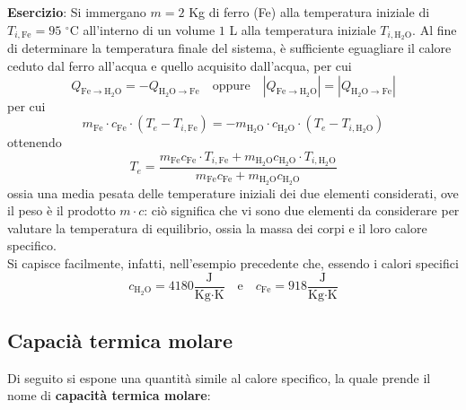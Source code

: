 \documentclass[a4paper]{extarticle}
\begin{document}
\vspace{1em}
\noindent
\textbf{Esercizio}: Si immergano $m=2$ Kg di ferro (Fe) alla temperatura iniziale di $T_{i,\text{Fe}}=95$ $^\circ$C all'interno di un volume $1$ L alla temperatura iniziale $T_{i,\text{H}_2\text{O}}$. Al fine di determinare la temperatura finale del sistema, è sufficiente eguagliare il calore ceduto dal ferro all'acqua e quello acquisito dall'acqua, per cui
\[Q_{\text{Fe} \to \text{H}_2\text{O}} = - Q_{\text{H}_2\text{O} \to \text{Fe}} \hspace{1em} \text{oppure} \hspace{1em} \left \vert Q_{\text{Fe} \to \text{H}_2\text{O}} \right \vert = \left \vert Q_{\text{H}_2\text{O} \to \text{Fe}} \right \vert\]
per cui
\[m_{\text{Fe}} \cdot c_{\text{Fe}} \cdot (T_e-T_{i,\text{Fe}}) = - m_{\text{H}_2\text{O}} \cdot c_{\text{H}_2\text{O}} \cdot (T_e - T_{i,\text{H}_2\text{O}})\]
ottenendo
\[\boxed{T_e = \frac{m_{\text{Fe}} c_{\text{Fe}} \cdot T_{i,\text{Fe}} + m_{\text{H}_2\text{O}} c_{\text{H}_2\text{O}} \cdot T_{i,\text{H}_2\text{O}}}{m_{\text{Fe}} c_{\text{Fe}} + m_{\text{H}_2\text{O}} c_{\text{H}_2\text{O}}}}\]
ossia una media pesata delle temperature iniziali dei due elementi considerati, ove il peso è il prodotto $m \cdot c$: ciò significa che vi sono due elementi da considerare per valutare la temperatura di equilibrio, ossia la massa dei corpi e il loro calore specifico.\\
Si capisce facilmente, infatti, nell'esempio precedente che, essendo i calori specifici
\[c_{\text{H}_2\text{O}} = 4180 \frac{\text{J}}{\text{Kg} \cdot \text{K}} \hspace{1em} \text{e} \hspace{1em} c_{\text{Fe}} = 918 \frac{\text{J}}{\text{Kg} \cdot \text{K}}\]

\vspace{1em}
\subsection{Capacià termica molare}
Di seguito si espone una quantità simile al calore specifico, la quale prende il nome di \textbf{capacità termica molare}:
\end{document}
